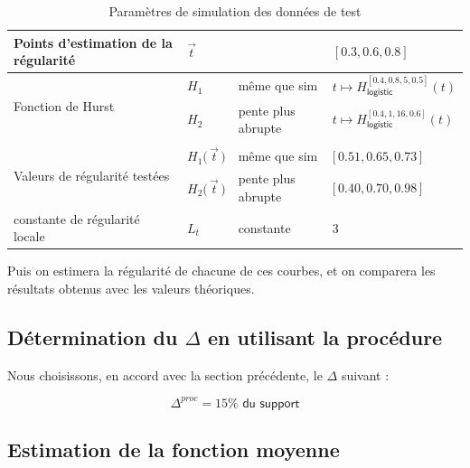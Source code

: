 \begin{table}[H]
\begin{tabularx}{\textwidth}{XXXX}
		\midrule
		Points d'estimation de la régularité                & $\vec t$                        &                    & $[0.3, 0.6, 0.8]$                                         \\
		\midrule
		\multirow{2}{\hsize}{Fonction de Hurst}             & $H_1$                           & même que sim       & $t \mapsto H^{[0.4, 0.8, 5, 0.5]}_{\textsf{logistic}}(t)$ \\
		                                                    & $H_2$                           & pente plus abrupte & $t \mapsto H^{[0.4, 1, 16, 0.6]}_{\textsf{logistic}}(t)$  \\
		\\
		\multirow{2}{\hsize}{Valeurs de régularité testées} & $H_1\bigl( \, \vec t \, \bigr)$ & même que sim       & $\bigl[ \, 0.51, 0.65, 0.73 \, \bigr]$                    \\
		                                                    & $H_2\bigl( \, \vec t \, \bigr)$ & pente plus abrupte & $\bigl[ \, 0.40, 0.70, 0.98 \, \bigr]$                    \\
		\midrule
		constante de régularité locale                      & $L_t$                           & constante          & 3                                                         \\
		\bottomrule
	\end{tabularx}
	\caption{Paramètres de simulation des données de test}
	\label{tab:sim_test_params}
\end{table}

\noindent Puis on estimera la régularité de chacune de ces courbes, et on comparera les résultats obtenus avec les valeurs théoriques.

\subsection{Détermination du $\Delta$ en utilisant la procédure}

Nous choisissons, en accord avec la section précédente, le $\Delta$ suivant :

\begin{equation*}
	\Delta^{proc} = 15\% \textsf{ du support}
\end{equation*}

\subsection{Estimation de la fonction moyenne}

